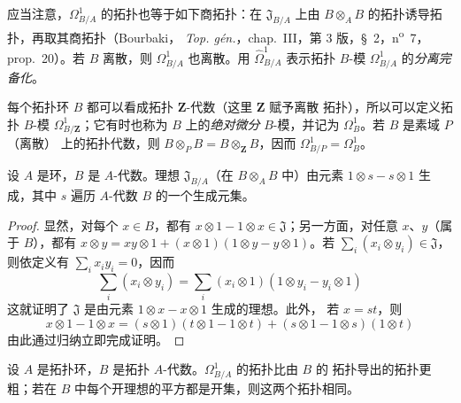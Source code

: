 应当注意，$\Omega^1_{B/A}$ 的拓扑也等于如下商拓扑：在
$\mathfrak{J}_{B/A}$ 上由 $B\otimes_A B$ 的拓扑诱导拓扑，再取其商拓扑（Bourbaki，
\emph{Top. gén.}，chap.~III，第 3 版，§~2，n\textsuperscript{o}~7，
prop.~20）。若 $B$ 离散，则 $\Omega^1_{B/A}$ 也离散。用
$\widehat{\Omega}^1_{B/A}$ 表示拓扑 $B$-模 $\Omega^1_{B/A}$ 的\emph{分离完备化}。

每个拓扑环 $B$ 都可以看成拓扑 $\mathbf{Z}$-代数（这里 $\mathbf{Z}$ 赋予离散
拓扑），所以可以定义拓扑 $B$-模 $\Omega^1_{B/\mathbf{Z}}$；它有时也称为 $B$
上的\emph{绝对微分} $B$-模，并记为 $\Omega^1_B$。若 $B$ 是素域 $P$（离散）
上的拓扑代数，则
$B\otimes_P B=B\otimes_{\mathbf{Z}}B$，因而
$\Omega^1_{B/P}=\Omega^1_B$。

\begin{lemma}[20.4.4]
\label{0.20.4.4-fr}
设 $A$ 是环，$B$ 是 $A$-代数。理想 $\mathfrak{J}_{B/A}$（在
$B\otimes_A B$ 中）由元素 $1\otimes s-s\otimes1$ 生成，其中 $s$ 遍历
$A$-代数 $B$ 的一个生成元集。
\end{lemma}

\begin{proof}
显然，对每个 $x\in B$，都有
$x\otimes1-1\otimes x\in\mathfrak{J}$；另一方面，对任意 $x$、$y$（属于
$B$），都有
$x\otimes y=xy\otimes1+(x\otimes1)(1\otimes y-y\otimes1)$。若
$\sum_i(x_i\otimes y_i)\in\mathfrak{J}$，则依定义有
$\sum_i x_i y_i=0$，因而
\begin{equation}
\tag{20.4.4.1}
\label{0.20.4.4.1-fr}
  \sum_i(x_i\otimes y_i)=
  \sum_i(x_i\otimes1)(1\otimes y_i-y_i\otimes1)
\end{equation}
这就证明了 $\mathfrak{J}$ 是由元素 $1\otimes x-x\otimes1$ 生成的理想。此外，
若 $x=st$，则
\begin{equation}
\tag{20.4.4.2}
\label{0.20.4.4.2-fr}
  x\otimes1-1\otimes x=(s\otimes1)(t\otimes1-1\otimes t)
  +(s\otimes1-1\otimes s)(1\otimes t)
\end{equation}
由此通过归纳立即完成证明。
\end{proof}

\begin{proposition}[20.4.5]
\label{0.20.4.5-fr}
设 $A$ 是拓扑环，$B$ 是拓扑 $A$-代数。$\Omega^1_{B/A}$ 的拓扑比由 $B$ 的
拓扑导出的拓扑更粗；若在 $B$ 中每个开理想的平方都是开集，则这两个拓扑相同。
\end{proposition}

